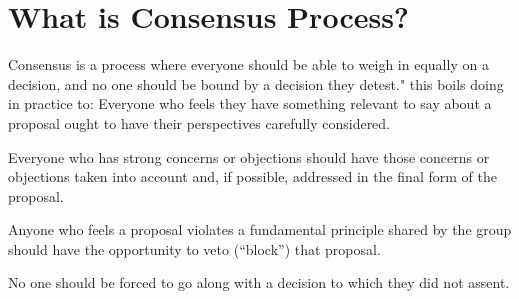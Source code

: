 \documentclass{article}
\begin{document}
\pagebreak

\section{What is Consensus Process?}

Consensus is a process where everyone should be able to weigh in equally on a decision, and no one should be bound by a decision they detest."
this boils doing in practice to: Everyone who feels they have something relevant to say about a proposal ought to have their perspectives carefully considered.

Everyone who has strong concerns or objections should have those concerns or objections taken into account and, if possible, addressed in the final form of the proposal.

Anyone who feels a proposal violates a fundamental principle shared by the group should have the opportunity to veto (“block”) that proposal.

No one should be forced to go along with a decision to which they did not assent.
\end{document}
